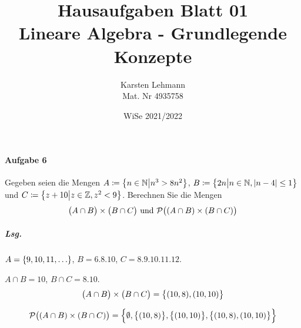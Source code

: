 \documentclass{scrreprt}
\author{Karsten Lehmann\\Mat. Nr 4935758}
\date{WiSe 2021/2022}
\title{Hausaufgaben Blatt 01\\Lineare Algebra - Grundlegende Konzepte}
\begin{document}
\paragraph{Aufgabe 6} Gegeben seien die Mengen
$A \coloneqq \qty\big{n \in \mathbb{N} {\big |} n^3 > 8n^2}$,
$B \coloneqq \qty\big{2n {\big |} n \in \mathbb{N}, \abs{n - 4} \leq 1}$
und $C \coloneqq \qty\big{z + 10 {\big |} z \in \mathbb{Z}, z^2 < 9}$.
Berechnen Sie die Mengen
\[
  \qty\big(A \cap B) \times \qty\big(B \cap C) \text{ und }
  \mathcal{P}\qty\big(\qty(A \cap B) \times (B \cap C))
\]

\subparagraph{Lsg.}
$A = \qty{9, 10, 11, \ldots}$,
$B = \qty{6, 8, 10}$,
$C = \qty{8, 9, 10, 11, 12}$.

$A \cap B = \qty{10}$, $B \cap C = \qty{8, 10}$.
\[
  \qty\big(A \cap B) \times \qty\big(B \cap C) = \qty\big{(10, 8), (10, 10)}
\]

\[
  \mathcal{P}\qty\big(\qty(A \cap B) \times (B \cap C)) =
  \qty\Big{
    \emptyset,
    \qty\big{\qty(10, 8)}, \qty\big{\qty(10, 10)},
    \qty\big{\qty(10, 8), \qty(10, 10)}
  }
\]
\end{document}
